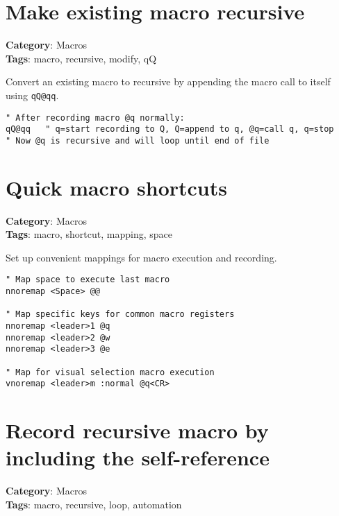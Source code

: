 {{{{{{{\section{Make existing macro recursive}

\textbf{Category}: Macros\\ \textbf{Tags}: macro, recursive, modify, qQ
\vspace{0.5cm}

Convert an existing macro to recursive by appending the macro call to itself using {\footnotesize \Verb§qQ@qq§}.

\begin{Exa*}{}
\begin{Verbatim}[fontsize=\footnotesize, breaklines, breakanywhere]
" After recording macro @q normally:
qQ@qq   " q=start recording to Q, Q=append to q, @q=call q, q=stop
" Now @q is recursive and will loop until end of file
\end{Verbatim}
\end{Exa*}

\section{Quick macro shortcuts}

\textbf{Category}: Macros\\ \textbf{Tags}: macro, shortcut, mapping, space
\vspace{0.5cm}

Set up convenient mappings for macro execution and recording.

\begin{Exa*}{}
\begin{Verbatim}[fontsize=\footnotesize, breaklines, breakanywhere]
" Map space to execute last macro
nnoremap <Space> @@

" Map specific keys for common macro registers
nnoremap <leader>1 @q
nnoremap <leader>2 @w
nnoremap <leader>3 @e

" Map for visual selection macro execution
vnoremap <leader>m :normal @q<CR>
\end{Verbatim}
\end{Exa*}

\section{Record recursive macro by including the self-reference}

\textbf{Category}: Macros\\ \textbf{Tags}: macro, recursive, loop, automation
\vspace{0.5cm}

}}}}}}}
